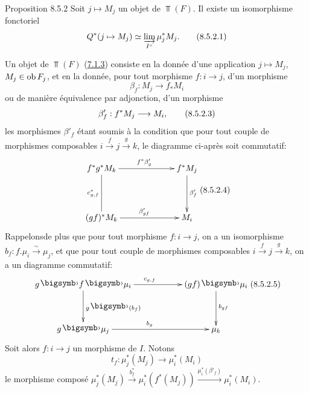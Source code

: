 \documentclass[10pt]{../fichiers-configuration-latex/smfart}
\begin{document}
\begin{enonce*}{Proposition 8.5.2}
Soit $j \mapsto M_j$ un objet de $\Top(F)$. Il existe un
isomorphisme fonctoriel
\begin{equation*}
Q^{\ast} (j \mapsto M_j)\simeq \mathop{\varinjlim}_{I^{\circ}}
\mu_j^{\ast} M_{j}{}.\tag{8.5.2.1}
\end{equation*}
\end{enonce*}
\noindent
Un objet de $\Top(F)$ (\hyperref[VI.subsubsec7.1.3]{7.1.3}) consiste en la donnée d'une application
$j \mapsto M_j$, $M_j \in \operatorname{ob} F_j$, et en la donnée, pour tout
morphisme $f : i \to j$, d'un morphisme
\begin{equation*}
\beta_f : M_j \to f_{\ast} M_i\tag{8.5.2.2}
\end{equation*}
ou de manière équivalence par adjonction, d'un morphisme
\begin{equation*}
\beta'_f:  f^{\ast} M_j \to M_i{\quoi},\tag{8.5.2.3}
\end{equation*}
les morphismes $\beta'_f$ étant soumis à la condition que pour tout
couple de morphismes composables $i \xrightarrow{f} j \xrightarrow{g}
k$, le diagramme ci-après soit commutatif:
\[\vcenter{
\xymatrix@C=2.25cm@R=1.5cm{
f^{\ast}g^{\ast}M_k    \ar[r]^{f^{\ast}\beta'_g} \ar@{-}[d]_{c^{\ast}_{g,f}}&
f^{\ast}M_j \ar@{->}[d]^{\beta'_f}\\
(gf)^{\ast}M_k         \ar[r]^{\beta'_{gf}}      & M_i
}}\leqno{(8.5.2.4)}
\]
Rappelons\pageoriginale de plus  que pour tout morphisme $f :
i \to j$, on a un isomorphisme $b_f : f. \mu_i \xrightarrow{\sim} \mu_j$, et que
pour tout couple de morphismes composables $i \xrightarrow{f} j
\xrightarrow{g} k$, on a un diagramme commutatif:
\[
\xymatrix@C=2cm@R=1.25cm{
g\bigdot f\bigdot \mu_i  \ar[r]^{c_{g,f}} \ar[d]^{g\bigdot (b_f)}&
(gf) \bigdot \mu_i \ar[d]^{b_{gf}}\\
g \bigdot \mu_j  \ar[r]^{b_g} & \mu_k
}\leqno{(8.5.2.5)}
\]
Soit alors $f : i \to j$ un morphisme de $I$. Notons
\begin{equation*}
t_f : \mu^{\ast}_j (M_j) \to \mu_i^{\ast} (M_i)\tag{8.5.2.6}
\end{equation*}
le morphisme composé $\mu^{\ast}_j (M_j)\xrightarrow{b^{\ast}_f}
\mu^{\ast}_i(f^{\ast}(M_j)) \xrightarrow{\mu^{\ast}_i(\beta'_f)}
\mu^{\ast}_i(M_i)$.
\end{document}
